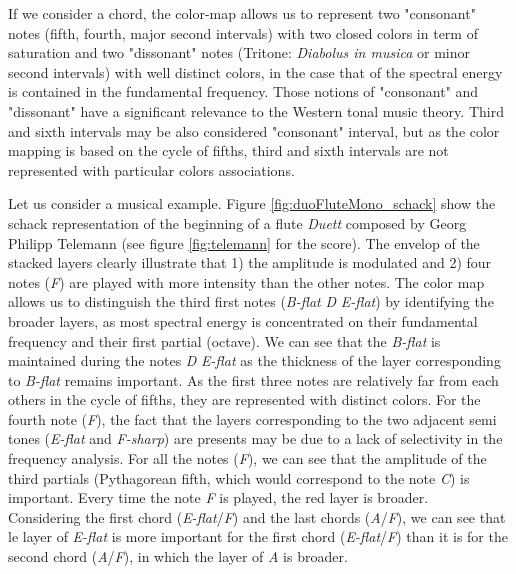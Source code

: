 \documentclass{article}
\begin{document}
If we consider a chord, the color-map allows us to represent two "consonant" notes (fifth, fourth, major second intervals) with two closed colors  in term of saturation and two "dissonant" notes (Tritone: \textit{Diabolus in musica} or minor second intervals) with well distinct colors, in the case that of the spectral energy is contained in the fundamental frequency. Those notions of "consonant" and "dissonant" have a significant relevance to the Western tonal music theory. Third and sixth intervals may be also considered "consonant" interval, but as the color mapping is based on the cycle of fifths, third and sixth intervals are not represented with particular colors associations. 

Let us consider a musical example. Figure \ref{fig:duoFluteMono_schack} show the schack representation of the beginning of a flute \textit{Duett} composed by Georg Philipp Telemann (see figure \ref{fig:telemann} for the score). The envelop of the stacked layers clearly illustrate that 1) the amplitude is modulated and  2) four notes (\textit{F}) are played with more intensity than the other notes. The color map allows us to distinguish the third first notes (\textit{B-flat} \textit{D} \textit{E-flat}) by identifying the broader layers, as most spectral energy is concentrated on their fundamental frequency and their first partial (octave). We can see that the \textit{B-flat} is maintained during the notes \textit{D} \textit{E-flat} as the thickness of the layer corresponding to  \textit{B-flat} remains important.  As the first three notes are relatively far from each others in the cycle of fifths, they are represented with distinct colors. For the fourth note (\textit{F}), the fact that the layers corresponding to the two adjacent semi tones (\textit{E-flat} and \textit{F-sharp}) are presents may be due to a lack of selectivity in the frequency analysis.
For all the notes (\textit{F}), we can see that the amplitude of the third partials (Pythagorean  fifth, which would correspond to the note \textit{C}) is important. Every time the note \textit{F} is played, the red layer is broader. \\

Considering the first chord (\textit{E-flat}/\textit{F}) and the last chords (\textit{A}/\textit{F}), we can see that le layer of \textit{E-flat} is more important for the first chord (\textit{E-flat}/\textit{F}) than it is for the second chord (\textit{A}/\textit{F}), in which the layer of \textit{A} is broader.  \\
\end{document}
